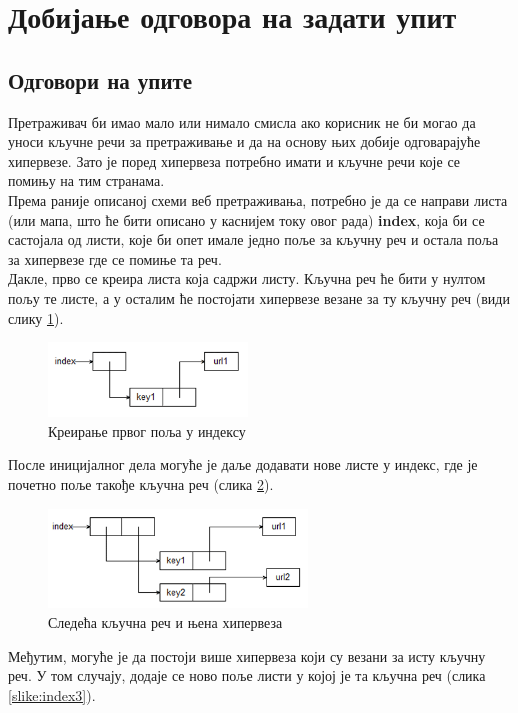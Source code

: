 \documentclass[11pt, serbianc, english, titlepage]{article}
\begin{document}
	\section{Добијање одговора на задати упит}	
	\subsection{Одговори на упите}
	Претраживач би имао мало или нимало смисла ако корисник не би могао да уноси кључне речи за претраживање и да на основу њих добије одговарајуће хипервезе. Зато је поред хипервеза потребно имати и кључне речи које се помињу на тим странама. \\
	Према раније описаној схеми веб претраживања, потребно је да се направи листа (или мапа, што ће бити описано у каснијем току овог рада) \textbf{index}, која би се састојала од листи, које би опет имале једно поље за кључну реч и остала поља за хипервезе где се помиње та реч. \\
	 Дакле, прво се креира листа која садржи листу. Кључна реч ће бити у нултом пољу те листе, а у осталим ће постојати хипервезе везане за ту кључну реч (види слику \ref{slike:indeks1}).\\
        \begin{figure}[here]
		\centering
		
		\includegraphics[height=75px, width=200px]{index1.png}
		\caption{Креирање првог поља у индексу}
		\label{slike:indeks1}
		\end{figure}
После иницијалног дела могуће је даље додавати нове листе у индекс, где је почетно поље такође кључна реч (слика \ref{slike:index2}).\\
		\begin{figure}[here]
		\centering
		
		\includegraphics[height=100px, width=260px]{index2.png}
		\caption{Следећа кључна реч и њена хипервеза}
		\label{slike:index2}
		\end{figure}
		Међутим, могуће је да постоји више хипервеза који су везани за исту кључну реч. У том случају, додаје се ново поље листи у којој је та кључна реч (слика \ref{slike:index3}).\\
		\\
		
\end{document}
